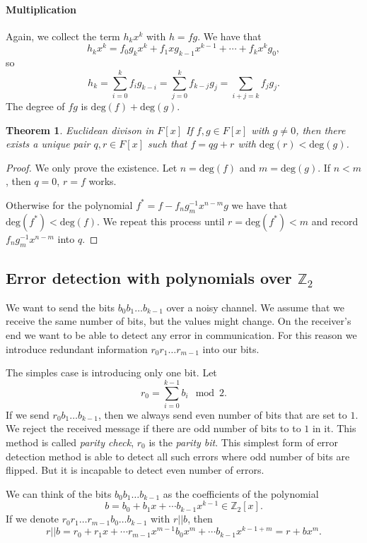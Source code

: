 \documentclass{article}
\newcommand{\Z}{\mathbb{Z}}
\newtheorem{theorem}{Theorem}
\begin{document}
\paragraph{Multiplication}
Again, we collect the term $h_k x^k$ with $h = fg$. We have that
\[
    h_k x^k = f_0 g_k x^k + f_1 x g_{k-1} x^{k-1} + \cdots + f_k x^k g_0,
\]
so
\[
    h_k = \sum_{i=0}^k f_i g_{k-i} = \sum_{j=0}^k f_{k-j} g_j = \sum_{i+j=k} f_j g_j.
\]
The degree of $fg$ is $\mathrm{deg}(f) + \mathrm{deg}(g)$.

\begin{theorem}{Euclidean divison in $F[x]$}
    If $f, g \in F[x]$ with $g \neq 0$, then there exists a unique pair $q,r \in F[x]$ such that $f = qg + r$ with $\mathrm{deg}(r) < \mathrm{deg}(g)$.
\end{theorem}
\begin{proof}
    We only prove the existence. Let $n = \mathrm{deg}(f)$ and $m = \mathrm{deg}(g)$. If $n < m$, then $q=0$, $r=f$ works.
    
    Otherwise for the polynomial $f^* = f - f_n g_m^{-1}x^{n-m} g$ we have that $\mathrm{deg}(f^*) < \mathrm{deg}(f)$.
    We repeat this process until $r = \mathrm{deg}(f^*) < m$ and record $f_n g_m^{-1}x^{n-m}$ into $q$.
\end{proof}

\subsection{Error detection with polynomials over $\Z_2$}

We want to send the bits $b_0 b_1 \ldots b_{k-1}$ over a noisy channel.
We assume that we receive the same number of bits, but the values might change.
On the receiver's end we want to be able to detect any error in communication.
For this reason we introduce redundant information $r_0 r_1 \ldots r_{m-1}$ into our bits.

The simples case is introducing only one bit.
Let
\[
    r_0 = \sum_{i=0}^{k-1} b_i \mod 2.
\]
If we send $r_0 b_1 \ldots b_{k-1}$, then we always send even number of bits that are set to $1$.
We reject the received message if there are odd number of bits to to $1$ in it.
This method is called \emph{parity check}, $r_0$ is the \emph{parity bit}.
This simplest form of error detection method is able to detect all such errors where odd number of bits are flipped.
But it is incapable to detect even number of errors.

We can think of the bits $b_0 b_1 \dots b_{k-1}$ as the coefficients of the polynomial
\[
    b = b_0 + b_1 x + \cdots b_{k-1} x^{k-1} \in \Z_2[x].
\]
If we denote $r_0 r_1 \ldots r_{m-1} b_0 \ldots b_{k-1}$ with $r||b$, then
\[
    r||b = r_0 + r_1 x + \cdots r_{m-1} x^{m-1} b_0 x^{m} + \cdots b_{k-1} x^{k-1 + m} = r + bx^m.
\]
\end{document}
